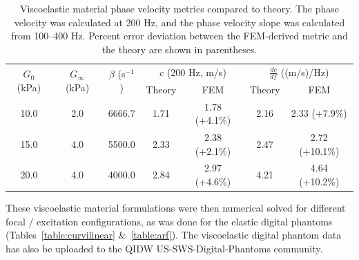 \begin{table}[htb!]
    \centering
    \caption{Viscoelastic material phase velocity metrics compared to theory.
        The phase velocity was calculated at 200 Hz, and the phase velocity
        slope was calculated from 100--400 Hz.  Percent error deviation between
        the FEM-derived metric and the theory are shown in parentheses.}
    \begin{tabular}{|c|c|c|c|c|c|c|}
    \hline
    \multirow{2}{*}{$G_0$ (kPa)} & \multirow{2}{*}{$G_\infty$ (kPa)} & \multirow{2}{*}{$\beta$ (s$^{-1}$)} & \multicolumn{2}{c|}{$c$ (200 Hz, m/s)} & \multicolumn{2}{c|}{$\frac{dc}{df}$ ((m/s)/Hz)} \\ \cline{4-7}
            & & & Theory & FEM & Theory & FEM \\ 
            \hline
            10.0 & 2.0 & 6666.7 & 1.71 & 1.78 (+4.1\%) & 2.16 & 2.33 (+7.9\%) \\ \hline
            15.0 & 4.0 & 5500.0 & 2.33 & 2.38 (+2.1\%) & 2.47 & 2.72 (+10.1\%) \\ \hline
            20.0 & 4.0 & 4000.0 & 2.84 & 2.97 (+4.6\%) & 4.21 & 4.64 (+10.2\%) \\
    \hline
    \end{tabular}
\label{table:ve_data}
\end{table}

These viscoelastic material formulations were then numerical solved for
different focal / excitation configurations, as was done for the elastic
digital phantoms (Tables~\ref{table:curvilinear} \&~\ref{table:arf}).  The
viscoelastic digital phantom data has also be uploaded to the QIDW
US-SWS-Digital-Phantoms community.
